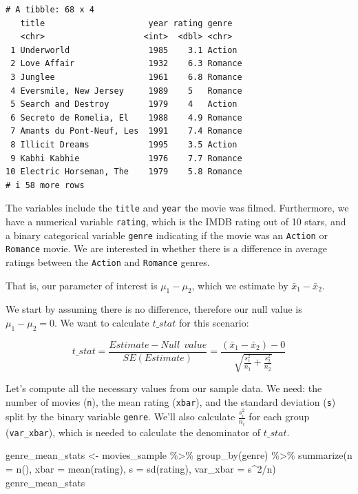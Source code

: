 \documentclass[
  letterpaper,
  DIV=11,
  numbers=noendperiod]{scrreprt}
\newenvironment{Shaded}{\begin{snugshade}}{\end{snugshade}}
\newcommand{\AttributeTok}[1]{\textcolor[rgb]{0.40,0.45,0.13}{#1}}
\newcommand{\DecValTok}[1]{\textcolor[rgb]{0.68,0.00,0.00}{#1}}
\newcommand{\FunctionTok}[1]{\textcolor[rgb]{0.28,0.35,0.67}{#1}}
\newcommand{\NormalTok}[1]{\textcolor[rgb]{0.00,0.23,0.31}{#1}}
\newcommand{\OtherTok}[1]{\textcolor[rgb]{0.00,0.23,0.31}{#1}}
\newcommand{\SpecialCharTok}[1]{\textcolor[rgb]{0.37,0.37,0.37}{#1}}
\theoremstyle{definition}
\theoremstyle{remark}
\begin{document}
\begin{verbatim}
# A tibble: 68 x 4
   title                     year rating genre  
   <chr>                    <int>  <dbl> <chr>  
 1 Underworld                1985    3.1 Action 
 2 Love Affair               1932    6.3 Romance
 3 Junglee                   1961    6.8 Romance
 4 Eversmile, New Jersey     1989    5   Romance
 5 Search and Destroy        1979    4   Action 
 6 Secreto de Romelia, El    1988    4.9 Romance
 7 Amants du Pont-Neuf, Les  1991    7.4 Romance
 8 Illicit Dreams            1995    3.5 Action 
 9 Kabhi Kabhie              1976    7.7 Romance
10 Electric Horseman, The    1979    5.8 Romance
# i 58 more rows
\end{verbatim}

The variables include the \texttt{title} and \texttt{year} the movie was
filmed. Furthermore, we have a numerical variable \texttt{rating}, which
is the IMDB rating out of 10 stars, and a binary categorical variable
\texttt{genre} indicating if the movie was an \texttt{Action} or
\texttt{Romance} movie. We are interested in whether there is a
difference in average ratings between the \texttt{Action} and
\texttt{Romance} genres.

That is, our parameter of interest is \(\mu_1 - \mu_2\), which we
estimate by \(\bar{x}_1 - \bar{x}_2\).

We start by assuming there is no difference, therefore our null value is
\(\mu_1 - \mu_2 = 0\). We want to calculate \(t\_stat\) for this
scenario:

\[t\_stat = \frac{Estimate - Null \ \ value}{SE(Estimate)} = \frac{(\bar{x}_1 - \bar{x}_2) - 0}{\sqrt{\frac{s_1^2}{n_1} + \frac{s_2^2}{n_2}}}\]

Let's compute all the necessary values from our sample data. We need:
the number of movies (\texttt{n}), the mean rating (\texttt{xbar}), and
the standard deviation (\texttt{s}) split by the binary variable
\texttt{genre}. We'll also calculate \(\frac{s_i^2}{n_i}\) for each
group (\texttt{var\_xbar}), which is needed to calculate the denominator
of \(t\_stat\).

\begin{Shaded}
\begin{Highlighting}[]
\NormalTok{genre\_mean\_stats }\OtherTok{\textless{}{-}}\NormalTok{ movies\_sample }\SpecialCharTok{\%\textgreater{}\%} 
  \FunctionTok{group\_by}\NormalTok{(genre) }\SpecialCharTok{\%\textgreater{}\%} 
  \FunctionTok{summarize}\NormalTok{(}\AttributeTok{n =} \FunctionTok{n}\NormalTok{(), }
            \AttributeTok{xbar =} \FunctionTok{mean}\NormalTok{(rating), }
            \AttributeTok{s =} \FunctionTok{sd}\NormalTok{(rating),}
            \AttributeTok{var\_xbar =}\NormalTok{ s}\SpecialCharTok{\^{}}\DecValTok{2}\SpecialCharTok{/}\NormalTok{n)}
\NormalTok{genre\_mean\_stats}
\end{Highlighting}
\end{Shaded}
\end{document}
